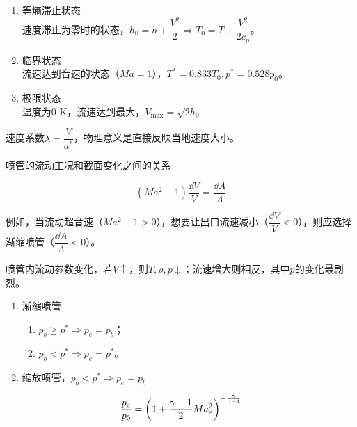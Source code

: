 
\begin{enumerate}
	\item 等熵滞止状态\\
	速度滞止为零时的状态，$h_0 = h + \dfrac{V^2}{2} \Rightarrow T_0 = T + \dfrac{V^2}{2 c_p}$。
	\item 临界状态\\
	流速达到音速的状态（$Ma = 1$），$T^{*} = 0.833 T_0, p^{*} = 0.528 p_0$。
	\item 极限状态\\
	温度为0 K，流速达到最大，$V_{\text{max}} = \sqrt{2h_0}$
\end{enumerate}



速度系数$\lambda = \dfrac{V}{a^{*}}$，物理意义是直接反映当地速度大小。


喷管的流动工况和截面变化之间的关系

\begin{equation}
	(Ma^2 - 1) \dfrac{\dd{V}}{V} = \dfrac{\dd{A}}{A}
\end{equation}

例如，当流动超音速（$Ma^2 - 1 > 0$），想要让出口流速减小（$\dfrac{\dd{V}}{V} < 0$），则应选择渐缩喷管（$\dfrac{\dd{A}}{A} < 0$）。

喷管内流动参数变化，若$V\uparrow$，则$T, \rho, p\downarrow$；流速增大则相反，其中$p$的变化最剧烈。

\begin{enumerate}
	\item 渐缩喷管
	\begin{enumerate}
		\item $p_b \geq p^{*} \Rightarrow p_e = p_b$；
		\item $p_b < p^{*} \Rightarrow p_e = p^{*}$。
	\end{enumerate}
    \item 缩放喷管，$p_b < p^{*} \Rightarrow p_e = p_b$
\end{enumerate}


\begin{equation}
	\dfrac{p_e}{p_0} = \qty(1 + \dfrac{\gamma - 1}{2} Ma_e^2)^{-\frac{\gamma}{\gamma - 1}}
\end{equation}


